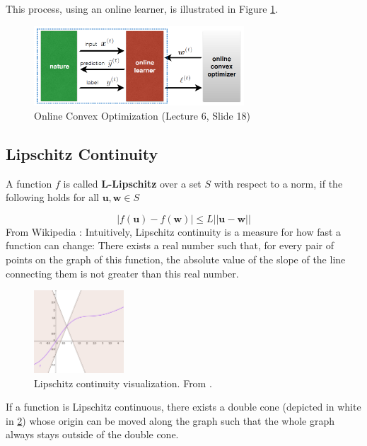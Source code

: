 \documentclass[11pt]{article}
\begin{document}
This process, using an online learner, is illustrated in Figure \ref{fig:online_convex_opt}.

\begin{figure}[ht]
    \centering
    \includegraphics[width=0.7\textwidth]{online_convex_opt}
    \caption{Online Convex Optimization (Lecture 6, Slide 18)}
    \label{fig:online_convex_opt}
\end{figure}

\subsection{Lipschitz Continuity}
A function $f$ is called \textbf{L-Lipschitz} over a set $S$ with respect to a norm, if the following holds for all $\boldsymbol{u},\boldsymbol{w}\in S$

\begin{equation*}
    |f(\boldsymbol{u})-f(\boldsymbol{w})|\leq L||\boldsymbol{u}-\boldsymbol{w}||    
\end{equation*}
From Wikipedia \cite{wikiLipschitz}: Intuitively, Lipschitz continuity is a measure for how fast a function can change: There exists a real number such that, for every pair of points on the graph of this function, the absolute value of the slope of the line connecting them is not greater than this real number.

\begin{figure}[ht]
    \centering
    \includegraphics[width=0.3\textwidth]{Lipschitz.png}
    \caption{Lipschitz continuity visualization. From \cite{wikiLipschitz}.}
    \label{fig:lipschitz_cone}
\end{figure}

If a function is Lipschitz continuous, there exists a double cone (depicted in white in \ref{fig:lipschitz_cone}) whose origin can be moved along the graph such that the whole graph always stays outside of the double cone.
\end{document}
